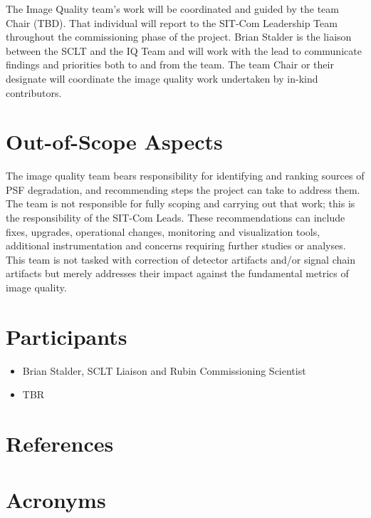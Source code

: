 \documentclass[SE,authoryear,toc]{lsstdoc}
\begin{document}
The Image Quality team's work will be coordinated and guided by the team Chair (TBD).
That individual will report to the SIT-Com Leadership Team throughout the commissioning phase of the project.
Brian Stalder is the liaison between the SCLT and the IQ Team and will work with the lead to communicate findings and priorities both to and from the team.
The team Chair or their designate will coordinate the image quality work undertaken by in-kind contributors.

\section{Out-of-Scope Aspects}
\label{sec:out_of_scope}

The image quality team bears responsibility for identifying and ranking sources of PSF degradation, and recommending steps the project can take to address them.
The team is not responsible for fully scoping and carrying out that work; this is the responsibility of the SIT-Com Leads.
These recommendations can include fixes, upgrades, operational changes, monitoring and visualization tools, additional instrumentation and concerns requiring further studies or analyses.
This team is not tasked with correction of detector artifacts and/or signal chain artifacts but merely addresses their impact against the fundamental metrics of image quality.

\section{Participants}
\label{sec:participants}

\begin{itemize}
\item Brian Stalder, SCLT Liaison and Rubin Commissioning Scientist
\item TBR
\end{itemize}


\appendix
\section{References} \label{sec:bib}
\renewcommand{\refname}{} %
%

\section{Acronyms} \label{sec:acronyms}

\end{document}
